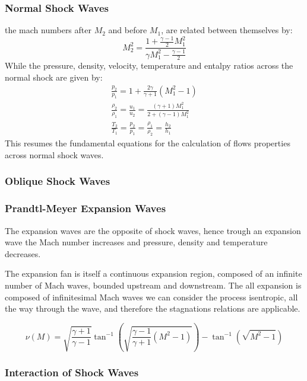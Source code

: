 \subsubsection{Normal Shock Waves}
the mach numbers after $M_2$ and before $M_1$, are related between themselves by:
\begin{equation}
M_2^2=\frac{1+ \frac{\gamma -1}{2}M_1^2}{\gamma M_1^2 - \frac{\gamma -1}{2}}
\end{equation}
While the pressure, density, velocity, temperature and entalpy ratios across the normal shock are given by:
\begin{eqnarray}
\frac{p_2}{p_1}=1+\frac{2\gamma}{\gamma +1} \left(M_1^2-1 \right)\\
\frac{\rho_2}{\rho_1}=\frac{u_1}{u_2}=\frac{\left(\gamma+1 \right) M_1^2}{2+\left(\gamma -1 \right) M_1^2}\\
\frac{T_2}{T_1}=\frac{p_2}{p_1}=\frac{\rho_1}{\rho_2}=\frac{h_2}{h_1}
\end{eqnarray}
This resumes the fundamental equations for the calculation of flows properties across normal shock waves.
\subsubsection{Oblique Shock Waves}


\subsubsection{Prandtl-Meyer Expansion Waves}

The expansion waves are the opposite of shock waves, hence trough an expansion wave the Mach number increases and pressure, density and temperature decreases.

The expansion fan is itself a continuous expansion region, composed of an infinite number of Mach waves, bounded upstream and downstream.
The all expansion is composed of infinitesimal Mach waves we can consider the process isentropic, all the way through the wave, and therefore the stagnations relations are applicable.



\begin{equation}
\nu(M)=\sqrt{\frac{\gamma +1}{\gamma-1}} \tan^{-1}\left( \sqrt{\frac{\gamma -1}{\gamma+1}(M^2-1)} \right) -\tan^{-1} \left( \sqrt{M^2-1}\right)
\end{equation}
\subsubsection{Interaction of Shock Waves}



